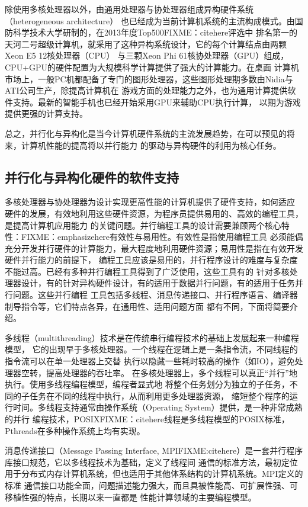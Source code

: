 除使用多核处理器以外，由通用处理器与协处理器组成异构硬件系统（heterogeneous architecture）
也已经成为当前计算机系统的主流构成模式。由国防科学技术大学研制的，在2013年度Top500FIXME：citehere评选中
排名第一的天河二号超级计算机，就采用了这种异构系统设计，它的每个计算结点由两颗Xeon E5 12核处理器（CPU）
与三颗Xeon Phi 61核协处理器（GPU）组成，CPU+GPU的硬件配置为大规模科学计算提供了强大的计算能力。在桌面
计算机市场上，一般PC机都配备了专门的图形处理器，这些图形处理期多数由Nidia与ATI公司生产，除提高计算机在
游戏方面的处理能力之外，也为通用计算提供软件支持。最新的智能手机也已经开始采用GPU来辅助CPU执行计算，
以期为游戏提供更强的计算支持。

总之，并行化与异构化是当今计算机硬件系统的主流发展趋势，在可以预见的将来，计算机性能的提高将以并行能力
的驱动与异构硬件的利用为核心任务。

\subsection{并行化与异构化硬件的软件支持}
多核处理器与协处理器为设计实现更高性能的计算机提供了硬件支持，如何适应
硬件的发展，有效地利用这些硬件资源，为程序员提供易用的、高效的编程工具，是提高计算机应用能力
的关键问题。并行编程工具的设计需要兼顾两个核心特性：FIXME：emphasizehere有效性与易用性。有效性是指使用编程工具
必须能偶充分开发并行硬件的计算能力，最大程度地利用硬件资源；易用性是指在有效开发硬件并行能力的前提下，
编程工具应该是易用的，并行程序设计的难度与复杂度不能过高。已经有多种并行编程工具得到了广泛使用，这些工具有的
针对多核处理器设计，有的针对异构硬件设计，有的适用于数据并行问题，有的适用于任务并行问题。这些并行编程
工具包括多线程、消息传递接口、并行程序语言、编译器制导指令等，它们特点各异，在通用性、适用问题方面
都有不同，下面将简要介绍。

多线程（multithreading）技术是在传统串行编程技术的基础上发展起来一种编程模型，
它的出现早于多核处理器。一个线程在逻辑上是一条指令流，不同线程的指令流可以在单一处理器上交替
执行以隐藏一些耗时较高的操作（如IO），避免处理器空转，提高处理器的吞吐率。
在多核处理器上，多个线程可以真正“并行”地执行。使用多线程编程模型，编程者显式地
将整个任务划分为独立的子任务，不同的子任务在不同的线程中执行，从而利用更多处理器资源，
缩短整个程序的运行时间。多线程支持通常由操作系统（Operating System）提供，是一种非常成熟的并行
编程技术，POSIXFIXME：citehere线程是多线程模型的POSIX标准，Pthreads在多种操作系统上均有实现。

消息传递接口（Message Passing Interface, MPIFIXME:citehere）是一套并行程序库接口规范，它以多线程技术为基础，定义了线程间
通信的标准方法，最初定位用于分布式内存计算机系统，但也适用于其他体系结构的计算机系统。MPI定义的标准
通信接口功能全面，问题描述能力强大，而且具被性能高、可扩展性强、可移植性强的特点，长期以来一直都是
性能计算领域的主要编程模型。

